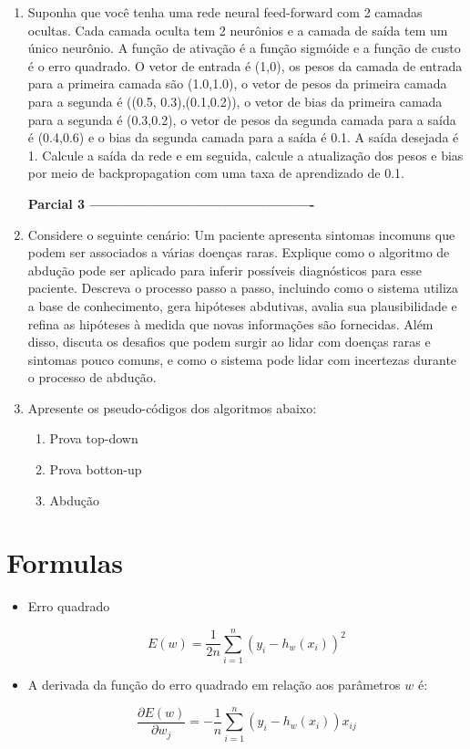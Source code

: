 \documentclass{article}
\begin{document}
\begin{enumerate}
    \item Suponha que você tenha uma rede neural feed-forward com 2 camadas ocultas. Cada camada oculta tem 2 neurônios e a camada de saída tem um único neurônio. A função de ativação é a função sigmóide e a função de custo é o erro quadrado. O vetor de entrada é (1,0), os pesos da camada de entrada para a primeira camada são (1.0,1.0), o vetor de pesos da primeira camada para a segunda é ((0.5, 0.3),(0.1,0.2)), o vetor de bias da primeira camada para a segunda é (0.3,0.2), o vetor de pesos da segunda camada para a saída é (0.4,0.6) e o bias da segunda camada para a saída é 0.1. A saída desejada é 1. Calcule a saída da rede e em seguida, calcule a atualização dos pesos e bias por meio de backpropagation com uma taxa de aprendizado de 0.1. 
    
\textbf{Parcial 3 ----------------------------------------------}

\item Considere o seguinte cenário: Um paciente apresenta sintomas incomuns que podem ser associados a várias doenças raras. Explique como o algoritmo de abdução pode ser aplicado para inferir possíveis diagnósticos para esse paciente. Descreva o processo passo a passo, incluindo como o sistema utiliza a base de conhecimento, gera hipóteses abdutivas, avalia sua plausibilidade e refina as hipóteses à medida que novas informações são fornecidas. Além disso, discuta os desafios que podem surgir ao lidar com doenças raras e sintomas pouco comuns, e como o sistema pode lidar com incertezas durante o processo de abdução.

\item Apresente os pseudo-códigos dos algoritmos abaixo:
    \begin{enumerate}
        \item Prova top-down
        \item Prova botton-up
        \item Abdução
    \end{enumerate}

\end{enumerate}

\pagebreak

\section*{Formulas}

\begin{itemize}
    \item Erro quadrado

    \[ E(w) = \frac{1}{2n} \sum_{i=1}^{n} (y_i - h_w(x_i))^2 \]

    \item A derivada da função do erro quadrado em relação aos parâmetros \( w \) é:

    \[ \frac{\partial E(w)}{\partial w_j} = -\frac{1}{n} \sum_{i=1}^{n} (y_i - h_w(x_i))x_{ij} \]

\end{itemize}
\end{document}

